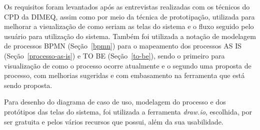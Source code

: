 Os requisitos foram levantados após as entrevistas realizadas com os técnicos do CPD da DIMEQ, assim como por meio da técnica de prototipação, utilizada para melhorar a visualização de como seriam as telas do sistema e o fluxo seguido pelo usuário para utilização do sistema. Também foi utilizada a notação de modelagem de processos BPMN (Seção~\ref{bpmn}) para o mapeamento dos processos AS IS (Seção~\ref{processo-as-is}) e TO BE (Seção~\ref{to-be}), sendo o primeiro para visualização de como o processo ocorre atualmente e o segundo uma proposta de processo, com melhorias sugeridas e com embasamento na ferramenta que está sendo proposta.

Para desenho do diagrama de caso de uso, modelagem do processo e dos protótipos das telas do sistema, foi utilizada a ferramenta \textit{draw.io}, escolhida, por ser gratuita e pelos vários recursos que possui, além da sua usabilidade.





